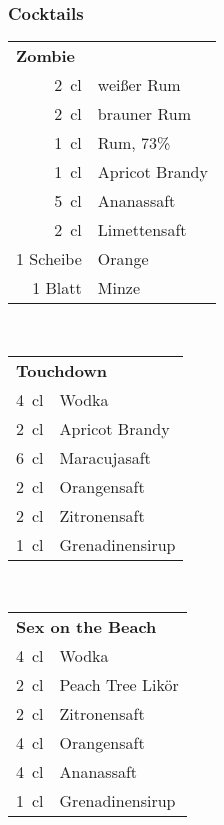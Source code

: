 \subsubsection{Cocktails}
\begin{table}[h!]
  \begin{subtable}[t]{0.3\textwidth}
    \centering
    \vspace{0pt}
    \begin{tabular}{|rl|} \hline
      \multicolumn{2}{|l|}{\textbf{Zombie}} \\
      \SI{2}{\centi\litre} & weißer Rum \\
      \SI{2}{\centi\litre} & brauner Rum \\
      \SI{1}{\centi\litre} & Rum, 73\% \\
      \SI{1}{\centi\litre} & Apricot Brandy \\
      \SI{5}{\centi\litre} & Ananassaft \\
      \SI{2}{\centi\litre} & Limettensaft \\
      1 Scheibe & Orange \\
      1 Blatt & Minze \\ \hline
    \end{tabular}
  \end{subtable}
  ~
  \begin{subtable}[t]{0.3\textwidth}
    \centering
    \vspace{0pt}
    \begin{tabular}{|rl|} \hline
      \multicolumn{2}{|l|}{\textbf{Touchdown}} \\
      \SI{4}{\centi\litre} & Wodka \\
      \SI{2}{\centi\litre} & Apricot Brandy \\
      \SI{6}{\centi\litre} & Maracujasaft \\
      \SI{2}{\centi\litre} & Orangensaft \\
      \SI{2}{\centi\litre} & Zitronensaft \\
      \SI{1}{\centi\litre} & Grenadinensirup \\ \hline
    \end{tabular}
  \end{subtable}
  ~
  \begin{subtable}[t]{0.3\textwidth}
    \centering
    \vspace{0pt}
    \begin{tabular}{|rl|} \hline
      \multicolumn{2}{|l|}{\textbf{Sex on the Beach}} \\
      \SI{4}{\centi\litre} & Wodka \\
      \SI{2}{\centi\litre} & Peach Tree Likör \\
      \SI{2}{\centi\litre} & Zitronensaft \\
      \SI{4}{\centi\litre} & Orangensaft \\
      \SI{4}{\centi\litre} & Ananassaft \\
      \SI{1}{\centi\litre} & Grenadinensirup \\ \hline
    \end{tabular}
  \end{subtable}


\end{table}
